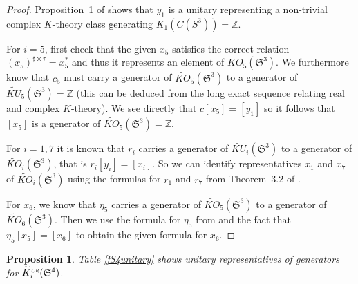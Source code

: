 \documentclass[12pt, reqno]{amsart}
\newtheorem{prop}[thm]{Proposition}
\theoremstyle{definition}
\def\Z{{\mathbb Z}}
\def\crr{^{\scriptscriptstyle {\it CR}}}
\newcommand{\fS}{\mathfrak S}
\begin{document}
\begin{proof}
Proposition~1 of \cite{SBS} shows that $y_1$ is a unitary representing a non-trivial complex $K$-theory class generating $K_1(C(S^3)) = \Z$. 

For $i = 5$, first check that the given $x_5$ satisfies the correct relation $(x_5)^{\sharp \otimes \tau} = x_5^*$ and thus it represents an element of ${KO}_5(\fS^3)$. We furthermore know that $c_5$ must carry a generator of $\widetilde{KO}_5(\fS^3)$ to a generator of $\widetilde{KU}_5(\fS^3) = \Z$ (this can be deduced from the long exact sequence relating real and complex $K$-theory).
We see directly that $c[x_5] = [y_1]$ so it follows that $[x_5]$ is a generator of $\widetilde{KO}_5(\fS^3) = \Z$.

For $i = 1,7$ it is known that $r_i$ carries a generator of $\widetilde{KU}_i(\fS^3)$ to a generator of $\widetilde{KO}_i(\fS^3)$, that is $r_i[y_i] = [x_i]$. So we can identify representatives $x_1$ and $x_7$ of $\widetilde{KO}_i(\fS^3)$ using the formulas for $r_1$ and $r_7$ from Theorem~3.2 of \cite{Boer2020}.

For $x_6$, we know that $\eta_5$ carries a generator of $\widetilde{KO}_5(\fS^3)$ to a generator of $\widetilde{KO}_6(\fS^3)$. Then we use the formula for $\eta_5$ from \cite{Boer2020} and the fact that $\eta_5[x_5] = [x_6]$ to obtain the given formula for $x_6$.
\end{proof}

\begin{prop}
Table \ref{fS4unitary} shows unitary representatives of generators for $\widetilde{K}\crr_i(\fS^4)$.
\end{prop}
\end{document}
